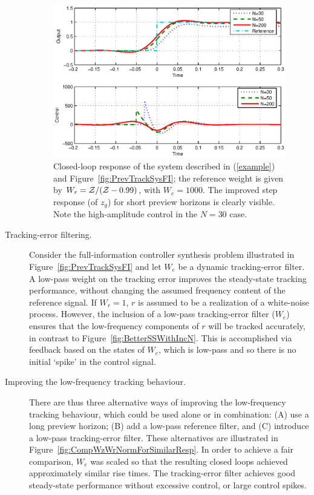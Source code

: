 \begin{description}
\begin{figure}
\includegraphics[width=\columnwidth]{./diags/WrWithIncreasingPreview.eps}
\caption{Closed-loop response of the system described in (\ref{example}) and Figure~\ref{fig:PrevTrackSysFI}; the reference weight is given by $W_r=\mathcal{Z}/(\mathcal{Z}-0.99)$, with $W_e=1000$. The improved step response (of $z_g$) for short preview horizons is clearly visible. Note the high-amplitude control in the $N=30$ case. \label{fig:WrWithIncreasingPreview}}
\end{figure}
\item[Tracking-error filtering.]
Consider the full-information controller synthesis problem illustrated in Figure~\ref{fig:PrevTrackSysFI} and let $W_e$ be a dynamic
tracking-error filter. A low-pass weight on the tracking error improves the steady-state tracking performance, without changing the assumed frequency content of the reference signal. If $W_r=1$, $r$ is assumed to be a realization of a white-noise process. However, the inclusion of a low-pass tracking-error filter ($W_e$) ensures that the low-frequency components of $r$ will be tracked accurately, in contrast to Figure~\ref{fig:BetterSSWithIncN}. This is accomplished via feedback based on the states of $W_e$, which is low-pass and so there is no initial `spike' in the control signal. 
\item[Improving the low-frequency tracking behaviour.]
There are thus three alternative ways of improving the low-frequency tracking behaviour, which could be used alone or in combination: (A) use a long preview horizon; (B) add a low-pass reference filter, and (C) introduce a low-pass tracking-error filter. These alternatives are illustrated in Figure~\ref{fig:CompWzWrNormForSimilarResp}. In order to achieve a fair comparison, $W_e$ was scaled so that the resulting closed loops achieved approximately similar rise times. The tracking-error filter achieves good steady-state performance without excessive control, or large control spikes.

\end{description}
